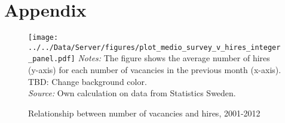 \appendix
\section{Appendix}
\label{sec:appendix}



\begin{figure}[h]
\centering
\caption{Relationship between number of vacancies and hires, 2001-2012}
\texttt{[image: ../../Data/Server/figures/plot\_medio\_survey\_v\_hires\_integer\_panel.pdf]}
\flushleft
\footnotesize{\emph{Notes:} The figure shows the average number of hires (y-axis) for each number of vacancies in the previous month (x-axis). TBD: Change background color.} \\
\footnotesize{\emph{Source:} Own calculation on data from Statistics Sweden.}
\label{fig:crossplot_panel}
\end{figure}







